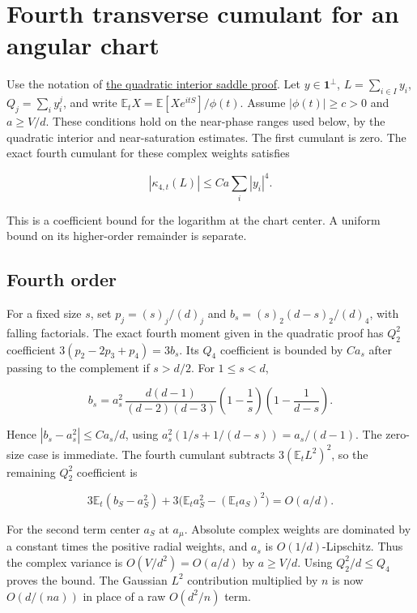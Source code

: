 \section{Fourth transverse cumulant for an angular chart}\label{sec:fourth-transverse-cumulant}

Use the notation of \href{https://github.com/ProgramComputer/open-math-research/blob/4fb624ba937a8eecc1361a6066185cd81ab7b172/topics/balanced-arrays/quadratic/very-tall-quadratic-interior-saddle.md}{the quadratic interior saddle proof}. Let $y\in\mathbf 1^\perp$, $L=\sum_{i\in I}y_i$, $Q_j=\sum_i y_i^j$, and write $\mathbb E_t X=\mathbb E[Xe^{itS}]/\phi(t)$. Assume $|\phi(t)|\ge c>0$ and $a\ge V/d$. These conditions hold on the near-phase ranges used below, by the quadratic interior and near-saturation estimates. The first cumulant is zero. The exact fourth cumulant for these complex weights satisfies

\begin{equation*}
|\kappa_{4,t}(L)|\le C a\sum_i|y_i|^4.
\end{equation*}

This is a coefficient bound for the logarithm at the chart center. A uniform bound on its higher-order remainder is separate.

\subsection{Fourth order}

For a fixed size $s$, set $p_j=(s)_j/(d)_j$ and $b_s=(s)_2(d-s)_2/(d)_4$, with falling factorials. The exact fourth moment given in the quadratic proof has $Q_2^2$ coefficient $3(p_2-2p_3+p_4)=3b_s$. Its $Q_4$ coefficient is bounded by $Ca_s$ after passing to the complement if $s>d/2$. For $1\le s<d$,

\begin{equation*}
b_s=a_s^2\,\frac{d(d-1)}{(d-2)(d-3)}
\left(1-\frac1s\right)\left(1-\frac1{d-s}\right).
\end{equation*}

Hence $|b_s-a_s^2|\le C a_s/d$, using $a_s^2(1/s+1/(d-s))=a_s/(d-1)$. The zero-size case is immediate. The fourth cumulant subtracts $3(\mathbb E_t L^2)^2$, so the remaining $Q_2^2$ coefficient is

\begin{equation*}
3\mathbb E_t(b_S-a_S^2)+3\bigl(\mathbb E_t a_S^2-(\mathbb E_t a_S)^2\bigr)=O(a/d).
\end{equation*}

For the second term center $a_S$ at $a_\mu$. Absolute complex weights are dominated by a constant times the positive radial weights, and $a_s$ is $O(1/d)$-Lipschitz. Thus the complex variance is $O(V/d^2)=O(a/d)$ by $a\ge V/d$. Using $Q_2^2/d\le Q_4$ proves the bound. The Gaussian $L^2$ contribution multiplied by $n$ is now $O(d/(na))$ in place of a raw $O(d^2/n)$ term.
